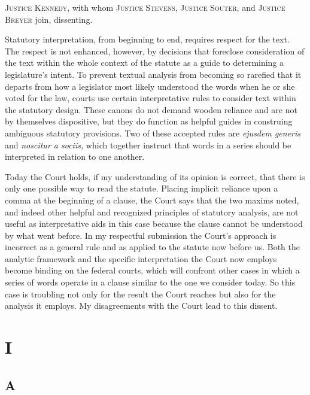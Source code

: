 
\setcounter{page}{228}

  \textsc{Justice Kennedy,} with whom \textsc{Justice Stevens, Justice Souter,} and \textsc{Justice Breyer} join, dissenting.

  Statutory interpretation, from beginning to end, requires respect for the text. The respect is not enhanced, however, by decisions that foreclose consideration of the text within the whole context of the statute as a guide to determining a legislature's intent. To prevent textual analysis from becoming so rarefied that it departs from how a legislator most likely understood the words when he or she voted for the law, courts use certain interpretative rules to consider text within the statutory design. These canons do not demand \newpage  wooden reliance and are not by themselves dispositive, but they do function as helpful guides in construing ambiguous statutory provisions. Two of these accepted rules are \emph{ejusdem generis} and \emph{noscitur a sociis,} which together instruct that words in a series should be interpreted in relation to one another.

  Today the Court holds, if my understanding of its opinion is correct, that there is only one possible way to read the statute. Placing implicit reliance upon a comma at the beginning of a clause, the Court says that the two maxims noted, and indeed other helpful and recognized principles of statutory analysis, are not useful as interpretative aids in this case because the clause cannot be understood by what went before. In my respectful submission the Court's approach is incorrect as a general rule and as applied to the statute now before us. Both the analytic framework and the specific interpretation the Court now employs become binding on the federal courts, which will confront other cases in which a series of words operate in a clause similar to the one we consider today. So this case is troubling not only for the result the Court reaches but also for the analysis it employs. My disagreements with the Court lead to this dissent.

\section{I}

\subsection{A}

